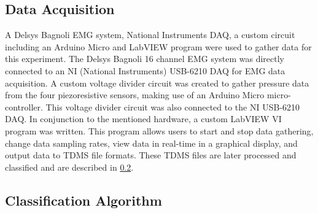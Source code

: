 \documentclass[twocolumn]{sagej}
\begin{document}
\begin{comment}
\begin{figure}[htbp]
\centering
\subfigure[]{\epsfig{figure=shoulder_down.png,height=1.5in}
\label{fig:arm_down}}
\subfigure[]{\epsfig{figure=shoulder_up2.png,height=1.62in}
\label{fig:arm_up}}
\subfigure[]{\epsfig{figure=shoulder_to_side.png,height=1.55in}
\label{fig:arm_out}}
\subfigure[]{\epsfig{figure=shoulder_across.png,height=1.55in}
\label{fig:arm_across}}
\caption{a) Arm 45 degrees shoulder flexion in the sagital plane (the hand approximately at waist-level) b) Arm 135 degrees of shoulder flexion in the sagittal plane (hand at approximately head-level) c) Arm out, away from the body (90 degrees abduction) d) Arm laterally across the body (adduction)}

\end{figure}
\end{comment}

\subsection{Data Acquisition}
\label{sec:daq}

A Delsys Bagnoli EMG system, National Instruments DAQ, a custom circuit including an Arduino Micro and LabVIEW program were used to gather data for this experiment.  The Delsys Bagnoli 16 channel EMG system was directly connected to an NI (National Instruments) USB-6210 DAQ for EMG data acquisition.  A custom voltage divider circuit was created to gather pressure data from the four piezoresistive sensors, making use of an Arduino Micro micro-controller.  This voltage divider circuit was also connected to the NI USB-6210 DAQ. In conjunction to the mentioned hardware, a custom LabVIEW VI program was written.  This program allows users to start and stop data gathering, change data sampling rates, view data in real-time in a graphical display, and output data to TDMS file formats.  These TDMS files are later processed and classified and are described in \ref{sec:classifier}.

\subsection{Classification Algorithm}
\label{sec:classifier}
\end{document}

